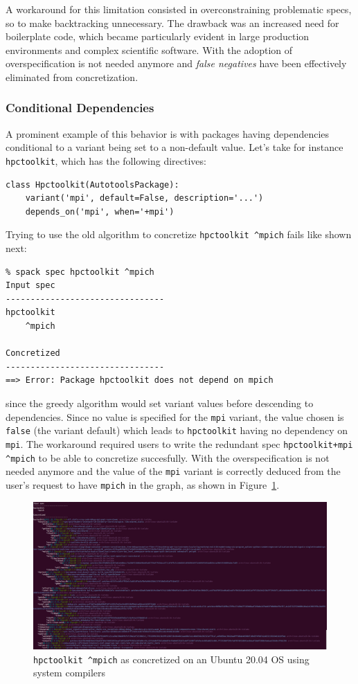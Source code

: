 A workaround for this limitation consisted in overconstraining problematic specs, so to make backtracking unnecessary. The drawback was an increased need for boilerplate code, which became particularly evident in large production environments and complex scientific software. With the adoption of \clingo{} overspecification is not needed anymore and \emph{false negatives} have been effectively eliminated from concretization.

\subsubsection{Conditional Dependencies}
A prominent example of this behavior is with packages having dependencies conditional to a variant being set to a non-default value. Let's take for instance \texttt{hpctoolkit}, which has the following directives:
\begin{verbatim}
class Hpctoolkit(AutotoolsPackage):
    variant('mpi', default=False, description='...')
    depends_on('mpi', when='+mpi')
\end{verbatim}
Trying to use the old algorithm to concretize \texttt{hpctoolkit \^{}mpich} fails like shown next:
\begin{verbatim}
% spack spec hpctoolkit ^mpich
Input spec
--------------------------------
hpctoolkit
    ^mpich

Concretized
--------------------------------
==> Error: Package hpctoolkit does not depend on mpich
\end{verbatim}
since the greedy algorithm would set variant values before descending to dependencies. Since no value is specified for the \texttt{mpi} variant, the value chosen is \texttt{false} (the variant default) which leads to \texttt{hpctoolkit} having no dependency on \texttt{mpi}. The workaround required users to write the redundant spec \texttt{hpctoolkit+mpi \^{}mpich} to be able to concretize succesfully. With \clingo{} the overspecification is not needed anymore and the value of the \texttt{mpi} variant is correctly deduced from the user's request to have \texttt{mpich} in the graph, as shown
in Figure~\ref{fig:hpctoolkit}.

\begin{figure}[h]
\includegraphics[width=\columnwidth]{figures/hpctoolkit_concretized.png}
\caption{\texttt{hpctoolkit \^{}mpich} as concretized on an Ubuntu 20.04 OS using system compilers}
\label{fig:hpctoolkit}
\end{figure}

